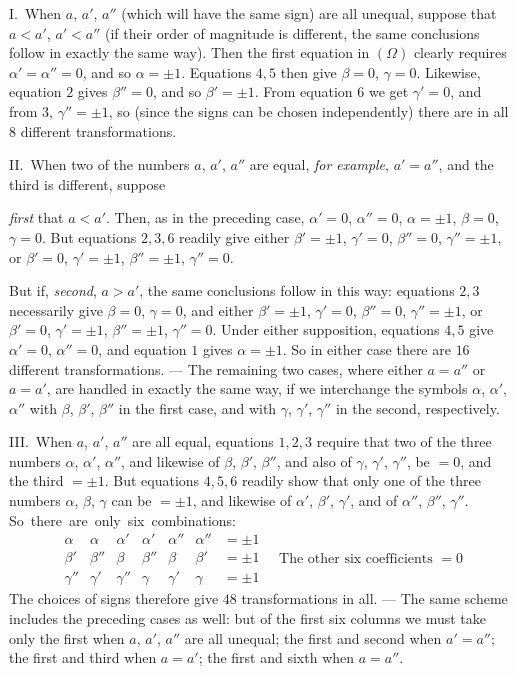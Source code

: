 I.\ When $a$, $a'$, $a''$ (which will have the same sign) are
all unequal, suppose that $a<a'$, $a'<a''$ (if their order of magnitude
is different, the same conclusions follow in exactly the same way).
Then the first equation in $(\Omega)$ clearly requires $\alpha'=\alpha''=0$, and so
$\alpha=\pm1$. Equations $4,5$ then give $\beta=0$, $\gamma=0$. Likewise, equation
$2$ gives $\beta''=0$, and so $\beta'=\pm1$. From equation $6$ we get
$\gamma'=0$, and from $3$, $\gamma''=\pm1$, so (since the signs can be chosen
independently) there are in all $8$ different transformations.

II.\ When two of the numbers $a$, $a'$, $a''$ are equal,
\textit{for example}, $a'=a''$, and the third is different, suppose

\textit{first} that $a<a'$. Then, as in the preceding case, $\alpha'=0$,
$\alpha''=0$, $\alpha=\pm1$, $\beta=0$, $\gamma=0$. But equations $2,3,6$ readily give
either $\beta'=\pm1$, $\gamma'=0$, $\beta''=0$, $\gamma''=\pm1$, or $\beta'=0$, $\gamma'=\pm1$, $\beta''=\pm1$, $\gamma''=0$.

But if, \textit{second}, $a>a'$, the same conclusions follow in this
way: equations $2,3$ necessarily give $\beta=0$, $\gamma=0$, and either
$\beta'=\pm1$, $\gamma'=0$, $\beta''=0$, $\gamma''=\pm1$, or $\beta'=0$, $\gamma'=\pm1$, $\beta''=\pm1$,
$\gamma''=0$. Under either supposition, equations $4,5$ give $\alpha'=0$,
$\alpha''=0$, and equation $1$ gives $\alpha=\pm1$. So in either case there
are $16$ different transformations. --- The remaining two cases,
where either $a=a''$ or $a=a'$, are handled in exactly the same way,
if we interchange the symbols $\alpha$, $\alpha'$, $\alpha''$ with $\beta$,
$\beta'$, $\beta''$ in the first case, and with $\gamma$, $\gamma'$, $\gamma''$
in the second, respectively.

III.\ When $a$, $a'$, $a''$ are all equal, equations $1,2,3$
require that two of the three numbers $\alpha$, $\alpha'$, $\alpha''$,
and likewise of $\beta$, $\beta'$, $\beta''$, and also of $\gamma$,
$\gamma'$, $\gamma''$, be $=0$, and the third $=\pm1$. But equations
$4,5,6$ readily show that only one of the three numbers $\alpha$,
$\beta$, $\gamma$ can be $=\pm1$, and likewise of $\alpha'$, $\beta'$,
$\gamma'$, and of $\alpha''$, $\beta''$, $\gamma''$. \mbox{So there are only six combinations:}
\[
\begin{array}{c|c|c|c|c|c|c|}
\alpha&\alpha&\alpha'&\alpha'&\alpha''&\alpha''&=\pm1\\
\beta'&\beta''&\beta&\beta''&\beta&\beta'&=\pm1\\
\gamma''&\gamma'&\gamma''&\gamma&\gamma'&\gamma&=\pm1
\end{array}
\quad\text{The other six coefficients }=0
\]
The choices of signs therefore give $48$ transformations in all.
--- The same scheme includes the preceding cases as well: but of the
first six columns we must take only the first when $a$, $a'$,
$a''$ are all unequal; the first and second when $a'=a''$; the first
and third when $a=a'$; the first and sixth when $a=a''$.


